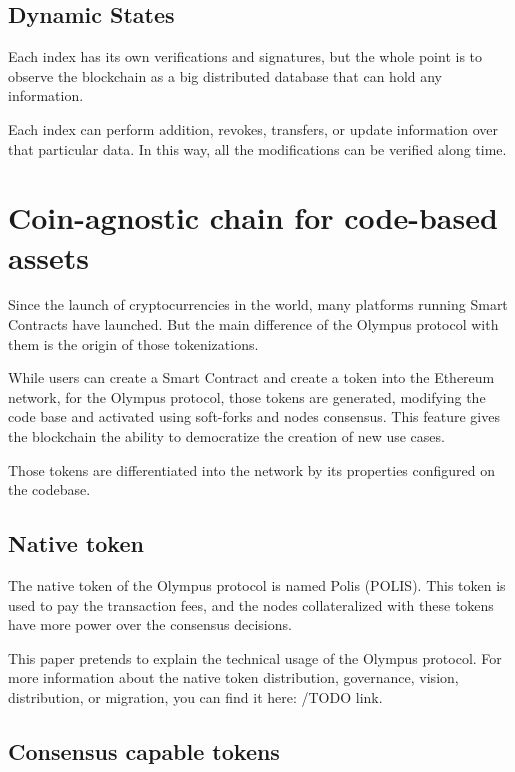 \documentclass{article}
\begin{document}
	\subsection{Dynamic States}		
	
	Each index has its own verifications and signatures, but the whole point is to observe the blockchain as a big distributed database that can hold any information. 
	
	Each index can perform addition, revokes, transfers, or update information over that particular data. In this way, all the modifications can be verified along time.
	
	\section{Coin-agnostic chain for code-based assets }
	
	Since the launch of cryptocurrencies in the world, many platforms running Smart Contracts have launched. But the main difference of the Olympus protocol with them is the origin of those tokenizations.
	
	While users can create a Smart Contract and create a token into the Ethereum network, for the Olympus protocol, those tokens are generated, modifying the code base and activated using soft-forks and nodes consensus. This feature gives the blockchain the ability to democratize the creation of new use cases.
	
	Those tokens are differentiated into the network by its properties configured on the codebase. 
	
	\subsection{Native token}
	
	The native token of the Olympus protocol is named Polis (POLIS). This token is used to pay the transaction fees, and the nodes collateralized with these tokens have more power over the consensus decisions. 
	
	This paper pretends to explain the technical usage of the Olympus protocol. For more information about the native token distribution, governance, vision, distribution, or migration, you can find it here: /TODO link.
	
	\subsection{Consensus capable tokens}	
	
\end{document}
